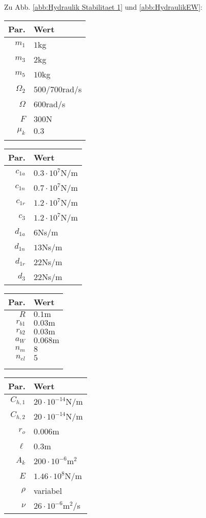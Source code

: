 Zu Abb. \ref{abb:Hydraulik Stabilitaet 1} und \ref{abb:HydraulikEW}:
\begin{center}
\begin{tabular}{r|l}
Par. &Wert\\\hline
$m_1$&$1$kg\\
$m_3$& $2$kg\\
$m_5$&$10$kg\\
$\Omega_2$&$500$/$700$rad/s\\
$\Omega$&$600$rad/s\\
$F$&$300$N\\
$\mu_k$& $0.3$\\
&\\
\end{tabular} \hfill
\begin{tabular}{r|l}
Par. &Wert\\\hline
$c_{1a}$&$0.3\cdot10^{7}$N/m\\
$c_{1n}$&$0.7\cdot10^{7}$N/m \\
$c_{1r}$ & $1.2\cdot10^{7}$N/m\\
$c_{3}$& $1.2\cdot10^{7}$N/m\\
$d_{1a}$&$6$Ns/m\\
$d_{1n}$&$13$Ns/m \\
$d_{1r}$ &$22$Ns/m\\
$d_{3}$ & $22$Ns/m\\
\end{tabular}\hfill
\begin{tabular}{r|l}
Par. &Wert\\\hline
$R$&$0.1\textrm{m}$ \\
$r_{b1}$&$0.03\textrm{m}$\\
$r_{b2}$&$0.03\textrm{m}$\\
$a_{W}$&$ 0.068\textrm{m}$\\
$n_m$&$8$\\
$n_{el}$&$5$\\
&\\
&
\end{tabular} \hfill
\begin{tabular}{r|l}
Par. &Wert\\\hline
$C_{h,1}$&$20\cdot10^{-14}$N/m\\
$C_{h,2}$&$20\cdot10^{-14}$N/m\\
$r_o$&$0.006$m\\
$\ell$&$0.3$m\\
$A_k$&$200\cdot10^{-6}$m$^2$\\
$E$&$1.46\cdot10^{8}$N/m\\
$\rho$&variabel\\
$\nu$&$26\cdot10^{-6}$m$^2$/s\\
\end{tabular}
\end{center}

